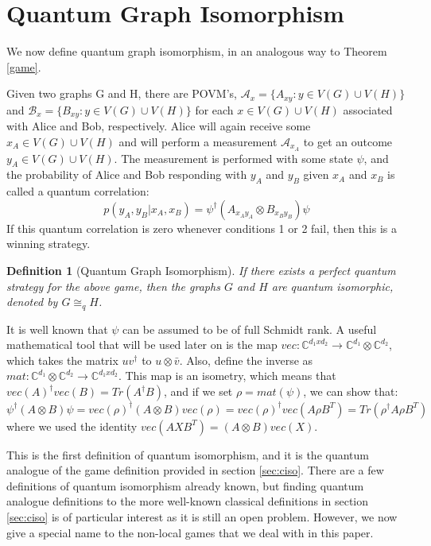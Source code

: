 \documentclass[12pt]{article}
\newtheorem{defn}[thm]{Definition}
\begin{document}
\section{Quantum Graph Isomorphism}
\label{sec:qiso}

We now define quantum graph isomorphism, in an analogous way to
Theorem \ref{game}.

Given two graphs G and H, there are POVM's, $\mathcal{A}_x = \{A_{xy}:
y \in V(G) \cup V(H)\}$ and $\mathcal{B}_x = \{B_{xy}: y \in V(G) \cup
V(H)\}$ for each $x \in V(G) \cup V(H)$ associated with Alice and Bob,
respectively.  Alice will again receive some $x_A \in V(G) \cup V(H)$
and will perform a measurement $\mathcal{A}_{x_A}$ to get an outcome
$y_A \in V(G) \cup V(H)$.  The measurement is performed with some
state $\psi$, and the probability of Alice and Bob responding with
$y_A$ and $y_B$ given $x_A$ and $x_B$ is called a quantum correlation:
\begin{equation}
p(y_A, y_B|x_A, x_B) = \psi^\dag(A_{x_Ay_A}\otimes B_{x_By_B})\psi
\end{equation}
If this quantum correlation is zero whenever conditions 1 or 2 fail,
then this is a winning strategy.

\begin{defn}[Quantum Graph Isomorphism]
  \label{qgame}
  If there exists a perfect quantum strategy for the above game, then
  the graphs $G$ and $H$ are quantum isomorphic, denoted by $G \cong_q
  H$.
\end{defn}

It is well known that $\psi$ can be assumed to be of full Schmidt
rank. A useful mathematical tool that will be used later on is the map
$vec: \mathbb{C}^{d_1 x d_2} \longrightarrow \mathbb{C}^{d_1} \otimes
\mathbb{C}^{d_2}$, which takes the matrix $uv^{\dag}$ to $u\otimes
\bar{v}$. Also, define the inverse as $mat: \mathbb{C}^{d_1} \otimes
\mathbb{C}^{d_2} \longrightarrow \mathbb{C}^{d_1 x d_2}$. This map is
an isometry, which means that $vec(A)^{\dag}vec(B) = Tr(A^{\dag}B)$,
and if we set $\rho = mat(\psi)$, we can show that:
\begin{equation}
\label{isometry}
\psi^{\dag} (A \otimes B) \psi = vec(\rho)^{\dag} (A \otimes B)
vec(\rho) = vec(\rho)^{\dag} vec(A \rho B^T) = Tr(\rho^{\dag} A\rho
B^T)
\end{equation}
where we used the identity $vec(AXB^T) = (A \otimes B)vec(X)$.

This is the first definition of quantum isomorphism, and it is the
quantum analogue of the game definition provided in section
\ref{sec:ciso}. There are a few definitions of quantum isomorphism
already known, but finding quantum analogue definitions to the more
well-known classical definitions in section \ref{sec:ciso} is of
particular interest as it is still an open problem. However, we now
give a special name to the non-local games that we deal with in this
paper.
\end{document}
